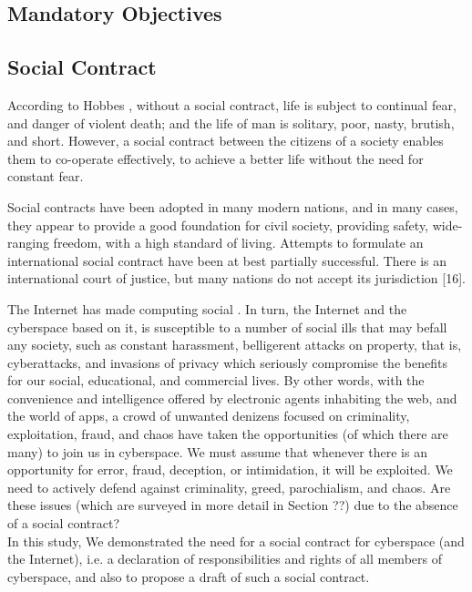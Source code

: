\subsection{Mandatory Objectives}
\subsection{Social Contract}
According to Hobbes \cite{Leviathan}, without a social contract, life is subject to continual fear, and danger of violent death; and the life of man is solitary, poor, nasty, brutish, and short. 
However, a social contract between the citizens of a society enables them to co-operate effectively, to achieve a better life without the need for constant fear.

Social contracts have been adopted in many modern nations, and in many cases, they appear to provide a good foundation for civil society, providing safety, wide-ranging freedom, with a high standard of living. Attempts to formulate an international social contract have been at best partially successful. There is an international court of justice, but many nations do not accept its jurisdiction [16].

The Internet has made computing social \cite{parameswaran2007social}. In turn, the Internet and the cyberspace based on it, is susceptible to a number of social ills that may befall any society, such as constant harassment, belligerent attacks on property, that is, cyberattacks, and invasions of privacy which seriously compromise the benefits for our social, educational, and commercial lives. By other words, with the convenience and intelligence offered by electronic agents inhabiting the web, and the world of apps, a crowd of unwanted denizens focused on criminality, exploitation, fraud, and chaos have taken the opportunities (of which there are many) to join us in cyberspace.  We must assume that whenever there is an opportunity for error, fraud, deception, or intimidation, it will be exploited. We need to actively defend against criminality, greed, parochialism, and chaos. Are these issues (which are surveyed in more detail in Section ??) due to the absence of a social contract? \\ In this study, We demonstrated the need for a social contract for cyberspace (and the Internet), i.e. a declaration of responsibilities and rights of all members of cyberspace, and also to propose a draft of such a social contract.


